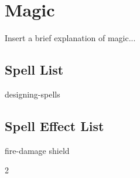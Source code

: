\chapter{Magic}\label{magic}

\begin{multicols*}{2}
    Insert a brief explanation of magic...
    
    \section{Spell List}
    
    {designing-spells}
	
    \section{Spell Effect List}
    {fire-damage}
    {shield}

\end{multicols*}{2}
